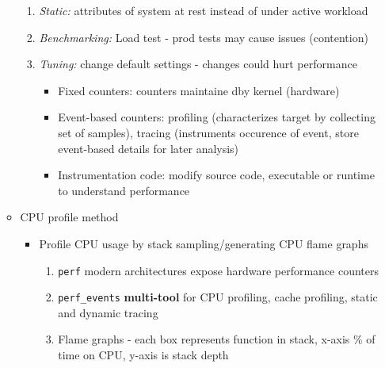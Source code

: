 \documentclass[10pt,landscape]{article}
\begin{document}
\begin{multicols*}{3}
\begin{itemize}[topsep=0pt,noitemsep,wide=0pt, leftmargin=\dimexpr{} + 2\relax]
\begin{itemize}[topsep=0pt,noitemsep,wide=0pt, leftmargin=\dimexpr{} + 2\relax]
\begin{enumerate}[topsep=0pt,noitemsep,wide=0pt, leftmargin=\dimexpr\labelwidth + 2\labelsep\relax]
            \item \textit{Static:} attributes of system at rest instead of under active workload
            \item \textit{Benchmarking:} Load test - prod tests may cause issues (contention)
            \item \textit{Tuning:} change default settings - changes could hurt performance
            \begin{itemize}[topsep=0pt,noitemsep,wide=0pt, leftmargin=\dimexpr{} + 2\relax]
                \item Fixed counters: counters maintaine dby kernel (hardware)
                \item Event-based counters: profiling (characterizes target by collecting set of samples), tracing (instruments occurence of event, store event-based details for later analysis)
                \item Instrumentation code: modify source code, executable or runtime to understand performance
            \end{itemize}
        \end{enumerate}
        \item CPU profile method
        \begin{itemize}[topsep=0pt,noitemsep,wide=0pt, leftmargin=\dimexpr{} + 2\relax]
            \item Profile CPU usage by stack sampling/generating CPU flame graphs
            \begin{enumerate}[topsep=0pt,noitemsep,wide=0pt, leftmargin=\dimexpr\labelwidth + 2\labelsep\relax]
                \item \verb|perf| modern architectures expose hardware performance counters
                \item \verb|perf_events| \textbf{multi-tool} for CPU profiling, cache profiling, static and dynamic tracing
                \item Flame graphs - each box represents function in stack, x-axis $\%$ of time on CPU, y-axis is stack depth
            \end{enumerate}
        \end{itemize}
    \end{itemize}
\end{itemize}


\end{multicols*}
\end{document}
